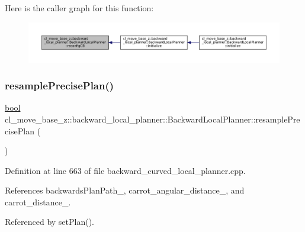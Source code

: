 Here is the caller graph for this function\+:
\nopagebreak
\begin{figure}[H]
\begin{center}
\leavevmode
\includegraphics[width=350pt]{classcl__move__base__z_1_1backward__local__planner_1_1BackwardLocalPlanner_a62e4783adae03ce92190d855a021b91d_icgraph}
\end{center}
\end{figure}
\mbox{\label{classcl__move__base__z_1_1backward__local__planner_1_1BackwardLocalPlanner_a100fe8bdaaf89b0fa54ecf2aef0966ed}} 
\subsubsection{\texorpdfstring{resample\+Precise\+Plan()}{resamplePrecisePlan()}}
{\footnotesize\ttfamily \hyperlink{classbool}{bool} cl\+\_\+move\+\_\+base\+\_\+z\+::backward\+\_\+local\+\_\+planner\+::\+Backward\+Local\+Planner\+::resample\+Precise\+Plan (\begin{DoxyParamCaption}{ }\end{DoxyParamCaption})\hspace{0.3cm}{\ttfamily [private]}}



Definition at line 663 of file backward\+\_\+curved\+\_\+local\+\_\+planner.\+cpp.



References backwards\+Plan\+Path\+\_\+, carrot\+\_\+angular\+\_\+distance\+\_\+, and carrot\+\_\+distance\+\_\+.



Referenced by set\+Plan().


